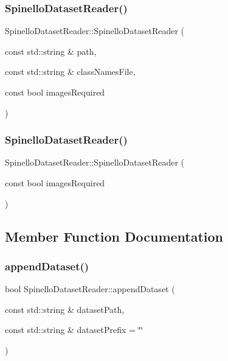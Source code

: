 \subsubsection{\texorpdfstring{Spinello\+Dataset\+Reader()}{SpinelloDatasetReader()}\hspace{0.1cm}{\footnotesize\ttfamily [1/2]}}
{\footnotesize\ttfamily Spinello\+Dataset\+Reader\+::\+Spinello\+Dataset\+Reader (\begin{DoxyParamCaption}\item[{const std\+::string \&}]{path,  }\item[{const std\+::string \&}]{class\+Names\+File,  }\item[{const bool}]{images\+Required }\end{DoxyParamCaption})}

\mbox{\label{class_spinello_dataset_reader_a894804f5b2ea181ba0b3d1b85ee43cfa}} 
\subsubsection{\texorpdfstring{Spinello\+Dataset\+Reader()}{SpinelloDatasetReader()}\hspace{0.1cm}{\footnotesize\ttfamily [2/2]}}
{\footnotesize\ttfamily Spinello\+Dataset\+Reader\+::\+Spinello\+Dataset\+Reader (\begin{DoxyParamCaption}\item[{const bool}]{images\+Required }\end{DoxyParamCaption})}



\subsection{Member Function Documentation}
\mbox{\label{class_spinello_dataset_reader_a2313fdf01fb702337dda812f0c341cd9}} 
\subsubsection{\texorpdfstring{append\+Dataset()}{appendDataset()}}
{\footnotesize\ttfamily bool Spinello\+Dataset\+Reader\+::append\+Dataset (\begin{DoxyParamCaption}\item[{const std\+::string \&}]{dataset\+Path,  }\item[{const std\+::string \&}]{dataset\+Prefix = {\ttfamily \char`\"{}\char`\"{}} }\end{DoxyParamCaption})\hspace{0.3cm}{\ttfamily [virtual]}}



